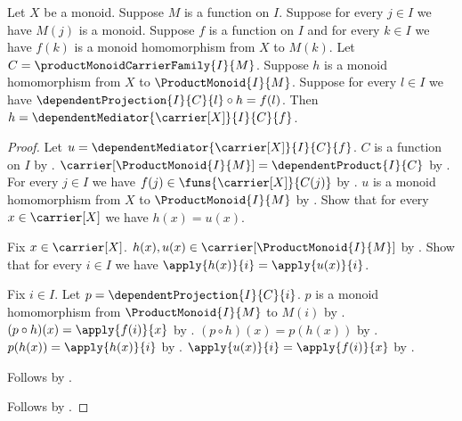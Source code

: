 \begin{theorem}\label{product_monoid_mediator_unique}
    Let $X$ be a monoid.
    Suppose $M$ is a function on $I$.
    Suppose for every $j\in I$ we have $M(j)$ is a monoid.
    Suppose $f$ is a function on $I$ and for every $k\in I$ we have
        $f(k)$ is a monoid homomorphism from $X$ to $M(k)$.
    Let $C=\productMonoidCarrierFamily{I}{M}$.
    Suppose $h$ is a monoid homomorphism from $X$ to
        $\ProductMonoid{I}{M}$.
    Suppose for every $l\in I$ we have
        $\dependentProjection{I}{C}{l}\circ h=f(l)$.
    Then $h=\dependentMediator{\carrier[X]}{I}{C}{f}$.
\end{theorem}
\begin{proof}
    Let $u=\dependentMediator{\carrier[X]}{I}{C}{f}$.
    $C$ is a function on $I$ by
        .
    $\carrier[\ProductMonoid{I}{M}]=\dependentProduct{I}{C}$ by
        .
    For every $j\in I$ we have
        $f(j)\in\funs{\carrier[X]}{C(j)}$ by
        .
    $u$ is a monoid homomorphism from $X$ to
        $\ProductMonoid{I}{M}$ by
        .
    Show that for every $x\in\carrier[X]$ we have $h(x)=u(x)$.
    \begin{subproof}
        Fix $x\in\carrier[X]$.
        $h(x),u(x)\in\carrier[\ProductMonoid{I}{M}]$ by
            .
        Show that for every $i\in I$ we have
            $\apply{h(x)}{i}=\apply{u(x)}{i}$.
        \begin{subproof}
            Fix $i\in I$.
            Let $p=\dependentProjection{I}{C}{i}$.
            $p$ is a monoid homomorphism from
                $\ProductMonoid{I}{M}$ to $M(i)$ by
                .
            $(p\circ h)(x)=\apply{f(i)}{x}$ by \auto.
            $(p\circ h)(x)=p(h(x))$ by
                .
            $p(h(x))=\apply{h(x)}{i}$ by
                .
            $\apply{u(x)}{i}=\apply{f(i)}{x}$ by
                .
        \end{subproof}
        Follows by
            .
    \end{subproof}
    Follows by .
\end{proof}

